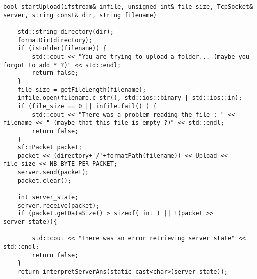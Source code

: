 \begin{lstlisting}
bool startUpload(ifstream& infile, unsigned int& file_size, TcpSocket& server, string const& dir, string filename)

	std::string directory(dir);
	formatDir(directory);
	if (isFolder(filename)) {
		std::cout << "You are trying to upload a folder... (maybe you forgot to add * ?)" << std::endl;
		return false;
	}
	file_size = getFileLength(filename);
	infile.open(filename.c_str(), std::ios::binary | std::ios::in);
	if (file_size == 0 || infile.fail() ) {
		std::cout << "There was a problem reading the file : " << filename << " (maybe that this file is empty ?)" << std::endl;
		return false;
	}
	sf::Packet packet;
	packet << (directory+'/'+formatPath(filename)) << Upload << file_size << NB_BYTE_PER_PACKET;
	server.send(packet);
	packet.clear();

	int server_state;
	server.receive(packet);
	if (packet.getDataSize() > sizeof( int ) || !(packet >> server_state)){

		std::cout << "There was an error retrieving server state" << std::endl;
		return false;
	}
	return interpretServerAns(static_cast<char>(server_state));
\end{lstlisting}
